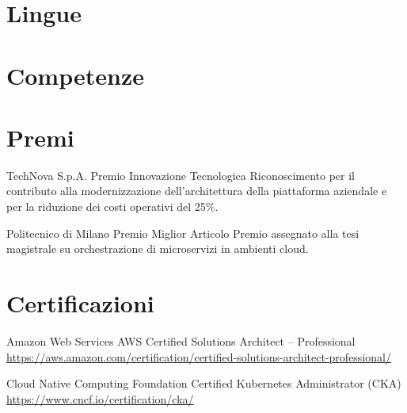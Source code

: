 \documentclass[a4paper, serif, 10pt]{moderncv}
\begin{document}
\section{Lingue}

\section{Competenze}

\section{Premi}

        {TechNova S.p.A.}
        {Premio Innovazione Tecnologica}
        {}
        {}
        {Riconoscimento per il contributo alla modernizzazione dell'architettura della piattaforma aziendale e per la riduzione dei costi operativi del 25\%.}

        {Politecnico di Milano}
        {Premio Miglior Articolo}
        {}
        {}
        {Premio assegnato alla tesi magistrale su orchestrazione di microservizi in ambienti cloud.}
\section{Certificazioni}

        {Amazon Web Services}
        {AWS Certified Solutions Architect – Professional}
        {\url{https://aws.amazon.com/certification/certified-solutions-architect-professional/}}
        {}
        {}

        {Cloud Native Computing Foundation}
        {Certified Kubernetes Administrator (CKA)}
        {\url{https://www.cncf.io/certification/cka/}}
        {}
        {}
\end{document}
